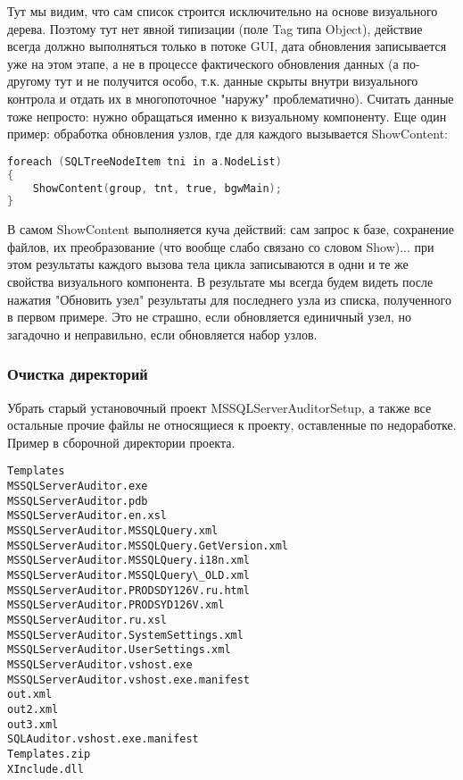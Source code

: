 \documentclass[10pt,a4paper]{article}
\begin{document}
Тут мы видим, что сам список строится исключительно на основе визуального
дерева. Поэтому тут нет явной типизации (поле Tag типа Object), действие всегда
должно выполняться только в потоке GUI, дата обновления записывается уже на этом
этапе, а не в процессе фактического обновления данных (а по-другому тут и не
получится особо, т.к. данные скрыты внутри визуального контрола и отдать их в
многопоточное "наружу" проблематично). Считать данные тоже непросто: нужно
обращаться именно к визуальному компоненту. Еще один пример: обработка
обновления узлов, где для каждого вызывается ShowContent:

\begin{lstlisting}[language=C,label=ShowContent.cs,caption=ShowContent.cs]
foreach (SQLTreeNodeItem tni in a.NodeList)
{
	ShowContent(group, tnt, true, bgwMain);
}
\end{lstlisting}

В самом ShowContent выполняется куча действий: сам запрос к базе, сохранение
файлов, их преобразование (что вообще слабо связано со словом Show)... при этом
результаты каждого вызова тела цикла записываются в одни и те же свойства
визуального компонента. В результате мы всегда будем видеть после нажатия
"Обновить узел" результаты для последнего узла из списка, полученного в первом
примере. Это не страшно, если обновляется единичный узел, но загадочно и
неправильно, если обновляется набор узлов.

\subsubsection{Очистка директорий}

Убрать старый установочный проект MSSQLServerAuditorSetup, а также все остальные
прочие файлы не относящиеся к проекту, оставленные по недоработке. Пример в
сборочной директории проекта.

\begin{verbatim}
Templates
MSSQLServerAuditor.exe
MSSQLServerAuditor.pdb
MSSQLServerAuditor.en.xsl
MSSQLServerAuditor.MSSQLQuery.xml
MSSQLServerAuditor.MSSQLQuery.GetVersion.xml
MSSQLServerAuditor.MSSQLQuery.i18n.xml
MSSQLServerAuditor.MSSQLQuery\_OLD.xml
MSSQLServerAuditor.PRODSDY126V.ru.html
MSSQLServerAuditor.PRODSYD126V.xml
MSSQLServerAuditor.ru.xsl
MSSQLServerAuditor.SystemSettings.xml
MSSQLServerAuditor.UserSettings.xml
MSSQLServerAuditor.vshost.exe
MSSQLServerAuditor.vshost.exe.manifest
out.xml
out2.xml
out3.xml
SQLAuditor.vshost.exe.manifest
Templates.zip
XInclude.dll
\end{verbatim}
\end{document}
